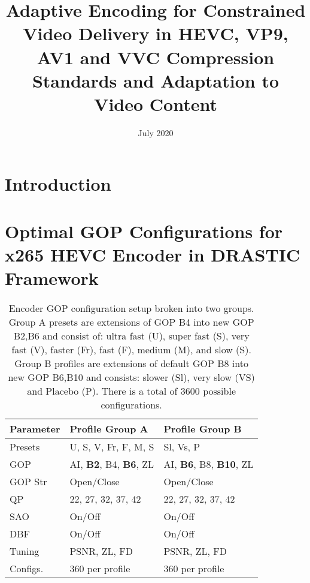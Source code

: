 \documentclass{book}
\begin{document}
	
	\frontmatter
	
	\title{ Adaptive Encoding for Constrained Video Delivery in HEVC, VP9, AV1 and VVC Compression Standards and
		Adaptation to Video Content}
	
	
	
	\date{July 2020}
	
	\maketitle
	
	\mainmatter
	
	\chapter{Introduction}
	
	
	
	\chapter[Optimal GOP Configurations for x265 HEVC Encoder]{Optimal GOP Configurations for x265 HEVC Encoder in DRASTIC Framework}
\begin{table}[t]
	\center
	\caption{Encoder GOP configuration setup broken into two groups.
		Group A presets are extensions of GOP B4 into new GOP B2,B6  and consist of:
		ultra fast (U), super fast (S), very fast (V), faster (Fr), fast (F), medium (M), 
		and slow (S).
		Group B profiles are extensions of default GOP B8 into new GOP B6,B10  and consists:
		slower (Sl), very slow (VS) and Placebo (P).
		There is a total of 3600 possible configurations.
	}\label{table:ProfConf}
	\begin{tabular}{l|ll} 
		\hline
		\textbf{Parameter} & \textbf{Profile Group A} & \textbf{Profile Group B} \\ 
		\hline\hline
		Presets             &  U, S, V, Fr, F, M, S & Sl, Vs, P                 \\
		GOP                 &    AI, \textbf{B2}, B4, \textbf{B6}, ZL   & AI, \textbf{B6}, B8, \textbf{B10}, ZL \\
		GOP Str             &    Open/Close            & Open/Close\\
		QP                    &   22, 27, 32, 37, 42   & 22, 27, 32, 37, 42 \\
		SAO                 &    On/Off                    & On/Off \\
		DBF                 &     On/Off                   & On/Off \\
		Tuning             &     PSNR, ZL, FD       & PSNR, ZL, FD        \\
		Configs.          &     360 per profile       & 360 per profile       \\
		\hline
	\end{tabular}
\end{table}
\end{document}
